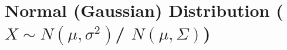 \chapter{Normal (Gaussian) Distribution ($X \sim N(\mu,\sigma^2)$/ $N(\mu, \Sigma)$) \cite{ism-1}} \label{Normal (Gaussian) Distribution}






























































